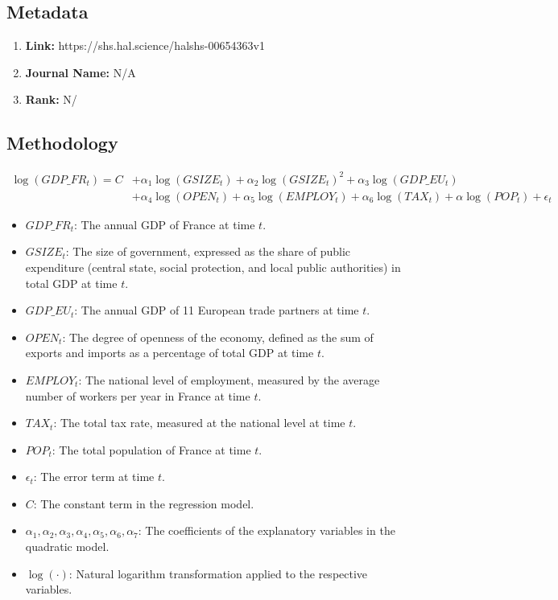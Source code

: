 \documentclass[10pt, oneside]{article}
\begin{document}
\subsection{Metadata}
\begin{enumerate}
	\item \textbf{Link:} https://shs.hal.science/halshs-00654363v1
	\item \textbf{Journal Name:} N/A
	\item \textbf{Rank:} N/
\end{enumerate}

\subsection{Methodology}

\[
	\begin{split}
		\log(GDP\_FR_t)  = C & + \alpha_1 \log(GSIZE_t) + \alpha_2 \log(GSIZE_t)^2  + \alpha_3 \log(GDP\_EU_t )                            \\
		                     & + \alpha_4 \log(OPEN_t) + \alpha_5 \log(EMPLOY_t ) + \alpha_6 \log(TAX_t) + \alpha \log(POP_t) + \epsilon_t
	\end{split}
\]
\begin{itemize}
	\item $GDP\_FR_t$: The annual GDP of France at time $t$.
	\item $GSIZE_t$: The size of government, expressed as the share of public expenditure (central state, social protection, and local public authorities) in total GDP at time $t$.
	\item $GDP\_EU_t$: The annual GDP of 11 European trade partners at time $t$.
	\item $OPEN_t$: The degree of openness of the economy, defined as the sum of exports and imports as a percentage of total GDP at time $t$.
	\item $EMPLOY_t$: The national level of employment, measured by the average number of workers per year in France at time $t$.
	\item $TAX_t$: The total tax rate, measured at the national level at time $t$.
	\item $POP_t$: The total population of France at time $t$.
	\item $\epsilon_t$: The error term at time $t$.
	\item $C$: The constant term in the regression model.
	\item $\alpha_1, \alpha_2, \alpha_3, \alpha_4, \alpha_5, \alpha_6, \alpha_7$: The coefficients of the explanatory variables in the quadratic model.
	\item $\log(\cdot)$: Natural logarithm transformation applied to the respective variables.
\end{itemize}
\end{document}
